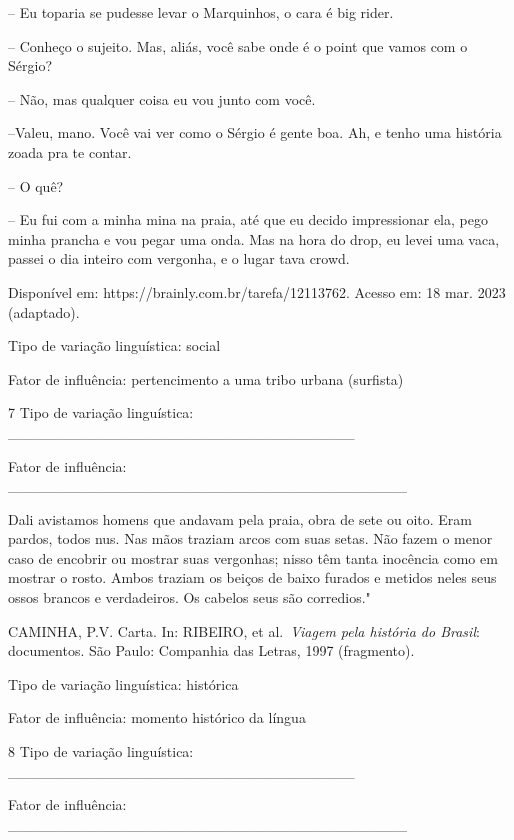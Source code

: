 -- Eu toparia se pudesse levar o Marquinhos, o cara é big rider.

-- Conheço o sujeito. Mas, aliás, você sabe onde é o point que vamos com
o Sérgio?

-- Não, mas qualquer coisa eu vou junto com você.

--Valeu, mano. Você vai ver como o Sérgio é gente boa. Ah, e tenho uma
história zoada pra te contar.

-- O quê?

-- Eu fui com a minha mina na praia, até que eu decido impressionar ela,
pego minha prancha e vou pegar uma onda. Mas na hora do drop, eu levei
uma vaca, passei o dia inteiro com vergonha, e o lugar tava crowd.

Disponível em: https://brainly.com.br/tarefa/12113762. Acesso em: 18
mar. 2023 (adaptado).

Tipo de variação linguística: social

Fator de influência: pertencimento a uma tribo urbana (surfista)

\num{7} Tipo de variação linguística:
\_\_\_\_\_\_\_\_\_\_\_\_\_\_\_\_\_\_\_\_\_\_\_\_\_\_\_\_\_\_\_\_\_

Fator de influência:
\_\_\_\_\_\_\_\_\_\_\_\_\_\_\_\_\_\_\_\_\_\_\_\_\_\_\_\_\_\_\_\_\_\_\_\_\_\_

Dali avistamos homens que andavam pela praia, obra de sete ou oito. Eram
pardos, todos nus. Nas mãos traziam arcos com suas setas. Não fazem o
menor caso de encobrir ou mostrar suas vergonhas; nisso têm tanta
inocência como em mostrar o rosto. Ambos traziam os beiços de baixo
furados e metidos neles seus ossos brancos e verdadeiros. Os cabelos
seus são corredios."

CAMINHA, P.V. Carta. In: RIBEIRO, et al.~\emph{Viagem pela história do
Brasil}: documentos. São Paulo: Companhia das Letras, 1997 (fragmento).

Tipo de variação linguística: histórica

Fator de influência: momento histórico da língua

\num{8} Tipo de variação linguística:
\_\_\_\_\_\_\_\_\_\_\_\_\_\_\_\_\_\_\_\_\_\_\_\_\_\_\_\_\_\_\_\_\_

Fator de influência:
\_\_\_\_\_\_\_\_\_\_\_\_\_\_\_\_\_\_\_\_\_\_\_\_\_\_\_\_\_\_\_\_\_\_\_\_\_\_

